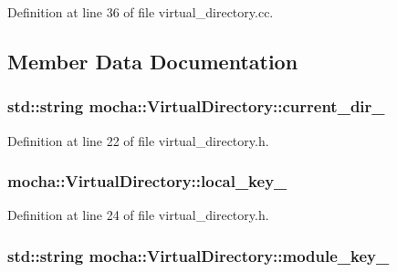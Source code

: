 Definition at line 36 of file virtual\_\-directory.cc.



\subsection{Member Data Documentation}
\hypertarget{classmocha_1_1_virtual_directory_acefb1f5f405adc754878aefabc10af65}{
\subsubsection[{current\_\-dir\_\-}]{\setlength{\rightskip}{0pt plus 5cm}std::string {\bf mocha::VirtualDirectory::current\_\-dir\_\-}}}
\label{classmocha_1_1_virtual_directory_acefb1f5f405adc754878aefabc10af65}


Definition at line 22 of file virtual\_\-directory.h.

\hypertarget{classmocha_1_1_virtual_directory_a048a3ff55c59332590f6b12cb2136084}{
\subsubsection[{local\_\-key\_\-}]{ {\bf mocha::VirtualDirectory::local\_\-key\_\-}}}
\label{classmocha_1_1_virtual_directory_a048a3ff55c59332590f6b12cb2136084}


Definition at line 24 of file virtual\_\-directory.h.

\hypertarget{classmocha_1_1_virtual_directory_a83d43f5ca023c7697322b2ca91bba902}{
\subsubsection[{module\_\-key\_\-}]{\setlength{\rightskip}{0pt plus 5cm}std::string {\bf mocha::VirtualDirectory::module\_\-key\_\-}}}
\label{classmocha_1_1_virtual_directory_a83d43f5ca023c7697322b2ca91bba902}


